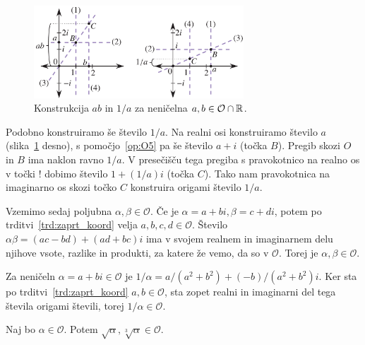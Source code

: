 \begin{dokaz}
    \begin{figure}[h]
        \centering
        \includegraphics[width=0.7\textwidth]{images/algebra/mnozenje_deljenje.png}
        \caption[Množenje in obratna vrednost realnih origami števil]{Konstrukcija $ab$ in $1/a$ za neničelna $a, b \in \mathcal{O} \cap \mathbb R$.}
        \label{fig:mnozenje_deljenje}
    \end{figure}

    Podobno konstruiramo še število $1/a$. Na realni osi konstruiramo število $a$ (slika~\ref{fig:mnozenje_deljenje} desno), s pomočjo~\ref{op:O5} pa še število $a + i$ (točka $B$). Pregib skozi $O$ in $B$ ima naklon ravno $1/a$. V presečišču tega pregiba s pravokotnico na realno os v točki $!$ dobimo število $1 + (1/a) i$ (točka $C$). Tako nam pravokotnica na imaginarno os skozi točko $C$ konstruira origami število $1/a$.

    Vzemimo sedaj poljubna $\alpha, \beta \in \mathcal{O}$. Če je $\alpha = a + bi, \beta = c + di$, potem po trditvi~\ref{trd:zaprt_koord} velja $a, b, c, d \in \mathcal{O}$. Število $\alpha \beta = (ac - bd) + (ad + bc)i$ ima v svojem realnem in imaginarnem delu njihove vsote, razlike in produkti, za katere že vemo, da so v $\mathcal{O}$. Torej je $\alpha, \beta \in \mathcal{O}$.

    Za neničeln $\alpha = a + bi \in \mathcal{O}$ je $1/\alpha = a/(a^2+b^2) + (-b)/(a^2+b^2)i$. Ker sta po trditvi~\ref{trd:zaprt_koord} $a, b \in \mathcal{O}$, sta zopet realni in imaginarni del tega števila origami števili, torej $1/\alpha \in \mathcal{O}$.
\end{dokaz}

\begin{trditev}
    \label{trd:zaprtost_koren}
    Naj bo $\alpha \in \mathcal{O}$. Potem $\sqrt{\alpha}, \sqrt[3]{\alpha} \in \mathcal{O}$.
\end{trditev}

